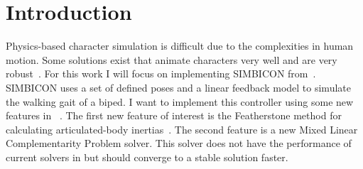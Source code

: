 
\section{Introduction}
\label{sec:Intro}


Physics-based character simulation is difficult due to the complexities in human motion.
Some solutions exist that animate characters very well and are very robust~\cite{Yin07,Coros09}.
For this work I will focus on implementing SIMBICON from~\cite{Yin07}.
SIMBICON uses a set of defined poses and a linear feedback model to simulate the walking gait of a biped.
I want to implement this controller using some new features in \bulletPhysics~\cite{coumans2013bullet}.
The first new feature of interest is the Featherstone method for calculating articulated-body inertias~\cite{featherstone2014rigid}. 
The second feature is a new Mixed Linear Complementarity Problem solver. %
This solver does not have the performance of current solvers in \bulletPhysics but should converge to a stable solution faster.

\begin{comment}
\begin{enumerate}
	\item {Character simulation is a complex problem}
	\item {Some solution exist for this problem that are very robust}
	\item {In particular "Generalized biped motion"}
	\item {This controller is supposed to model the character animation problem in a general way.}
	\item {I want to implement this controller again using some new features in \bulletPhysics}
\end{enumerate}
\end{comment}